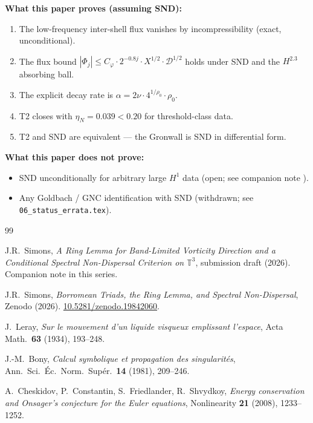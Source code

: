\documentclass[11pt]{article}
\begin{document}
\begin{mdframed}[linecolor=darkblue,linewidth=1pt]
\textbf{What this paper proves (assuming SND):}
\begin{enumerate}
\item The low-frequency inter-shell flux vanishes by incompressibility (exact, unconditional).
\item The flux bound $|\Phi_j|\leq C_\varphi\cdot 2^{-0.8j}\cdot X^{1/2}\cdot\mathcal{D}^{1/2}$
holds under SND and the $H^{2.3}$ absorbing ball.
\item The explicit decay rate is $\alpha = 2\nu\cdot 4^{1/\rho_0}\cdot\rho_0$.
\item T2 closes with $\eta_N = 0.039 < 0.20$ for threshold-class data.
\item T2 and SND are equivalent --- the Gronwall is SND in differential form.
\end{enumerate}

\textbf{What this paper does not prove:}
\begin{itemize}
\item SND unconditionally for arbitrary large $H^1$ data (open; see companion note \cite{SimonsRingSubmit}).
\item Any Goldbach / GNC identification with SND (withdrawn; see \texttt{06\_status\_errata.tex}).
\end{itemize}
\end{mdframed}

\begin{thebibliography}{99}

J.R.~Simons,
\textit{A Ring Lemma for Band-Limited Vorticity Direction and a Conditional
Spectral Non-Dispersal Criterion on $\mathbb{T}^3$},
submission draft (2026). Companion note in this series.

J.R.~Simons,
\textit{Borromean Triads, the Ring Lemma, and Spectral Non-Dispersal},
Zenodo (2026). \href{https://doi.org/10.5281/zenodo.19842060}{10.5281/zenodo.19842060}.

J.~Leray,
\textit{Sur le mouvement d'un liquide visqueux emplissant l'espace},
Acta Math.\ \textbf{63} (1934), 193--248.

J.-M.~Bony,
\textit{Calcul symbolique et propagation des singularit\'es},
Ann.\ Sci.\ \'Ec.\ Norm.\ Sup\'er.\ \textbf{14} (1981), 209--246.

A.~Cheskidov, P.~Constantin, S.~Friedlander, R.~Shvydkoy,
\textit{Energy conservation and Onsager's conjecture for the Euler equations},
Nonlinearity \textbf{21} (2008), 1233--1252.

\end{thebibliography}
\end{document}
